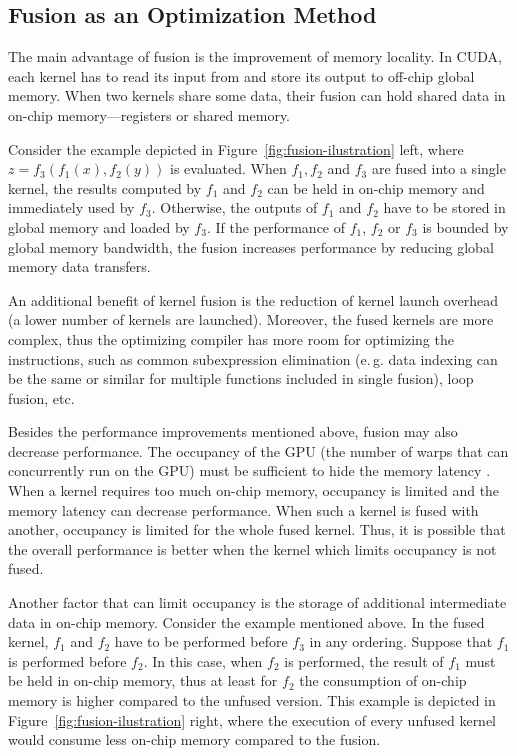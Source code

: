 \documentclass[final]{siamltex}
\def\eg{e.\,g.}
\begin{document}
\subsection{Fusion as an Optimization Method}

The main advantage of fusion is the improvement of memory locality. In CUDA, each kernel has to read its input from and store its output to off-chip global memory. When two kernels share some data, their fusion can hold shared data in on-chip memory---registers or shared memory. 

Consider the example depicted in Figure~\ref{fig:fusion-ilustration} left, where $z = f_3(f_1(x), f_2(y))$ is evaluated. When $f_1, f_2$ and $f_3$ are fused into a single kernel, the results computed by $f_1$ and $f_2$ can be held in on-chip memory and immediately used by $f_3$. Otherwise, the outputs of $f_1$ and $f_2$ have to be stored in global memory and loaded by $f_3$. If the performance of $f_1$, $f_2$ or $f_3$ is bounded by global memory bandwidth, the fusion increases performance by reducing global memory data transfers.

An additional benefit of kernel fusion is the reduction of kernel launch overhead (a lower number of kernels are launched). Moreover, the fused kernels are more complex, thus the optimizing compiler has more room for optimizing the instructions, such as common subexpression elimination (\eg{} data indexing can be the same or similar for multiple functions included in single fusion), loop fusion, etc.

Besides the performance improvements mentioned above, fusion may also decrease performance. The occupancy of the GPU (the number of warps that can concurrently run on the GPU) must be sufficient to hide the memory latency \cite{nvidia2011nvidia}. When a kernel requires too much on-chip memory, occupancy is limited and the memory latency can decrease performance. When such a kernel is fused with another, occupancy is limited for the whole fused kernel. Thus, it is possible that the overall performance is better when the kernel which limits occupancy is not fused.

Another factor that can limit occupancy is the storage of additional intermediate data in on-chip memory. Consider the example mentioned above. In the fused kernel, $f_1$ and $f_2$ have to be performed before $f_3$ in any ordering. Suppose that $f_1$ is performed before $f_2$. In this case, when $f_2$ is performed, the result of $f_1$ must be held in on-chip memory, thus at least for $f_2$ the consumption of on-chip memory is higher compared to the unfused version. This example is depicted in Figure~\ref{fig:fusion-ilustration} right, where the execution of every unfused kernel would consume less on-chip memory compared to the fusion.
\end{document}
